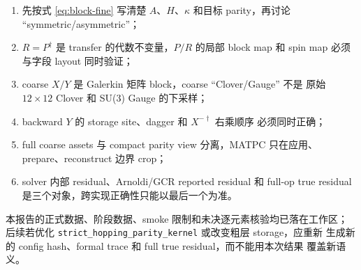 \documentclass[UTF8,a4paper,11pt]{ctexart}
\begin{document}
\begin{enumerate}
  \item 先按式 \eqref{eq:block-fine} 写清楚 $A$、$H$、$\kappa$ 和目标
        parity，再讨论 ``symmetric/asymmetric''；
  \item $R=P^\dagger$ 是 transfer 的代数不变量，$P/R$ 的局部 block map
        和 spin map 必须与字段 layout 同时验证；
  \item coarse $X/Y$ 是 Galerkin 矩阵 block，coarse ``Clover/Gauge'' 不是
        原始 $12\times12$ Clover 和 SU(3) Gauge 的下采样；
  \item backward $Y$ 的 storage site、dagger 和 $X^{-\dagger}$ 右乘顺序
        必须同时正确；
  \item full coarse assets 与 compact parity view 分离，MATPC 只在应用、
        prepare、reconstruct 边界 crop；
  \item solver 内部 residual、Arnoldi/GCR reported residual 和 full-op true
        residual 是三个对象，跨实现正确性只能以最后一个为准。
\end{enumerate}

本报告的正式数据、阶段数据、smoke 限制和未决逐元素核验均已落在工作区；
后续若优化 \mbox{\texttt{strict\_hopping\_parity\_kernel}} 或改变粗层 storage，应重新
生成新的 config hash、formal trace 和 full true residual，而不能用本次结果
覆盖新语义。
\end{document}
